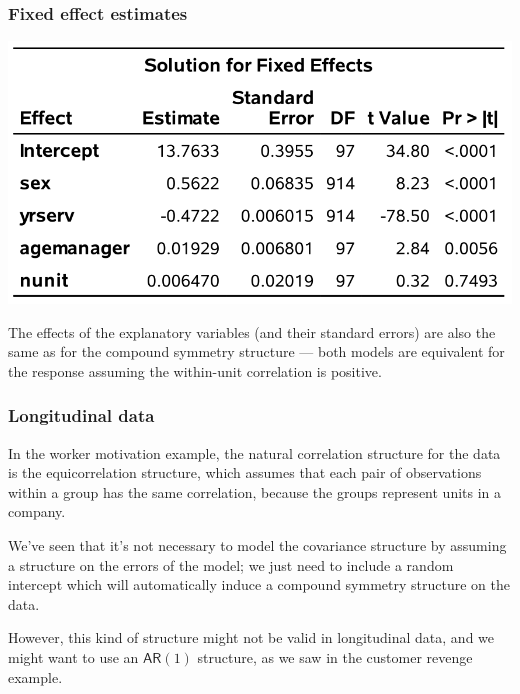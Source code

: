 \documentclass{beamer}
\begin{document}
\begin{frame}[fragile]
\frametitle{Fixed effect estimates}
\begin{center}
\includegraphics[width = 0.7\linewidth]{img/c6/slides7-e10}
\end{center}
{\footnotesize The effects of the explanatory variables (and their standard errors)
are also the same as for the compound symmetry structure --- both models are equivalent for the response assuming the within-unit correlation is positive. 


}
\end{frame}
% 
% 

 \begin{frame}
\frametitle{Longitudinal data}
\bi
\item In the worker motivation example, the natural correlation structure for the data is the equicorrelation  structure, which assumes that each pair of observations within a group has the same correlation, because the groups represent units in a company.
\item We've seen that it's not necessary to model the covariance structure by assuming a structure on the errors  of the model; we just need to include a random intercept which will automatically induce a compound symmetry structure on the data. 
\item However, this kind of structure might not be valid in longitudinal data, and we might want to use an $\mathsf{AR}(1)$ structure, as we saw in the customer revenge example.
\ei
\end{frame}
\end{document}
